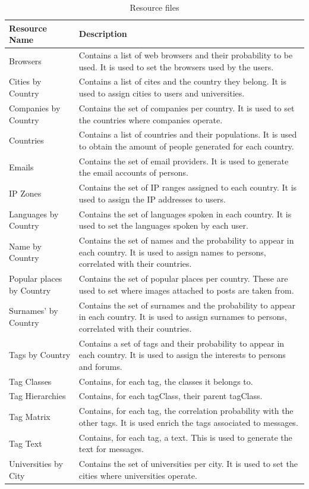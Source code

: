 \begin{table}[H]
\begin{tabular}{|p{4cm}|p{12cm}|}
    \hline
    \textbf{Resource Name} & \textbf{Description} \\
    \hline
    Browsers & Contains a list of web browsers and their probability to be used. It is used to set the browsers used by the users.\\
    \hline
    Cities by Country & Contains a list of cites and the country they belong. It is used to assign cities to users and universities.\\
    \hline
    Companies by Country & Contains the set of companies per country. It is used to set the countries where companies operate.\\
    \hline
    Countries & Contains a list of countries and their populations. It is used to obtain the amount of people generated for each country.\\
    \hline
    Emails & Contains the set of email providers. It is used to generate the email accounts of persons.\\
    \hline
    IP Zones & Contains the set of IP ranges assigned to each country. It is used to assign the IP addresses to users.\\
    \hline
    Languages by Country & Contains the set of languages spoken in each country. It is used to set the languages spoken by each user.\\
    \hline
    Name by Country & Contains the set of names and the probability to appear in each country. It is used to assign names to persons, correlated with their countries.\\
    \hline
    Popular places by Country & Contains the set of popular places per country. These are used to set where images attached to posts are taken from.\\
    \hline
    Surnames' by Country & Contains the set of surnames and the probability to appear in each country. It is used to assign surnames to persons, correlated with their countries.\\
    \hline
    Tags by Country & Contains a set of tags and their probability to appear in each country. It is used to assign the interests to persons and forums.\\
    \hline
    Tag Classes & Contains, for each tag, the classes it belongs to.\\
    \hline
    Tag Hierarchies & Contains, for each tagClass, their parent tagClass.\\
    \hline
    Tag Matrix & Contains, for each tag, the correlation probability with the other tags. It is used enrich the tags associated to messages.\\
    \hline
    Tag Text & Contains, for each tag, a text. This is used to generate the text for messages.\\
    \hline
    Universities by City & Contains the set of universities per city. It is used to set the cities where universities operate.\\
    \hline
\end{tabular}
    \caption{Resource files}
    \label{table:property_dictionaries}
\end{table}

